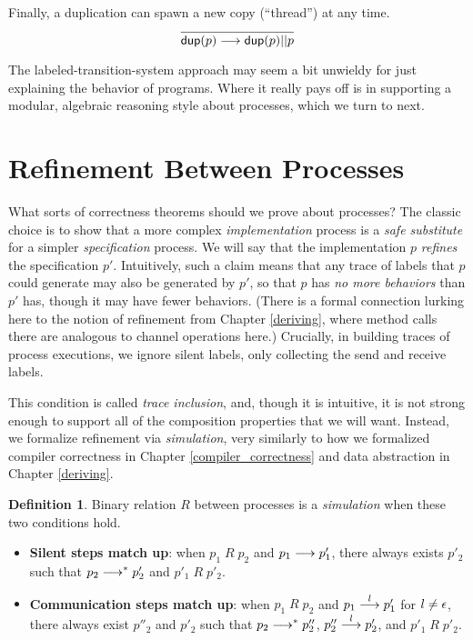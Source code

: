 \documentclass{amsbook}
\theoremstyle{definition}
\newtheorem{definition}[theorem]{Definition}
\theoremstyle{remark}
\numberwithin{section}{chapter}
\numberwithin{equation}{chapter}
\begin{document}
Finally, a duplication can spawn a new copy (``thread'') at any time.
$$\infer{\lts{\dup{p}}{}{\parl{\dup{p}}{p}}}{}$$

The labeled-transition-system approach may seem a bit unwieldy for just explaining the behavior of programs.
Where it really pays off is in supporting a modular, algebraic reasoning style about processes, which we turn to next.


\section{Refinement Between Processes}

What sorts of correctness theorems should we prove about processes?
The classic choice is to show that a more complex \emph{implementation} process is a \emph{safe substitute} for a simpler \emph{specification} process.
We will say that the implementation $p$ \emph{refines} the specification $p'$.
Intuitively, such a claim means that any trace of labels that $p$ could generate may also be generated by $p'$, so that $p$ has \emph{no more behaviors} than $p'$ has, though it may have fewer behaviors.
(There is a formal connection lurking here to the notion of refinement from Chapter \ref{deriving}, where method calls there are analogous to channel operations here.)
Crucially, in building traces of process executions, we ignore silent labels, only collecting the send and receive labels.

This condition is called \emph{trace inclusion}, and, though it is intuitive, it is not strong enough to support all of the composition properties that we will want.
Instead, we formalize refinement via \emph{simulation}, very similarly to how we formalized compiler correctness in Chapter \ref{compiler_correctness} and data abstraction in Chapter \ref{deriving}.

\abstraction
\begin{definition}
  Binary relation $R$ between processes is a \emph{simulation} when these two conditions hold.
  \begin{itemize}
  \item \textbf{Silent steps match up}: when $p_1 \; R \; p_2$ and $p_1 \stackrel{}{\longrightarrow} p'_1$, there always exists $p'_2$ such that $p_2 \stackrel{}{\longrightarrow}^* p'_2$ and $p'_1 \; R \; p'_2$.
  \item \textbf{Communication steps match up}: when $p_1 \; R \; p_2$ and $p_1 \stackrel{l}{\longrightarrow} p'_1$ for $l \neq \epsilon$, there always exist $p''_2$ and $p'_2$ such that $p_2 \stackrel{}{\longrightarrow}^* p''_2$, $p''_2 \stackrel{l}{\longrightarrow} p'_2$, and $p'_1 \; R \; p'_2$.
  \end{itemize}
\end{definition}
\end{document}

